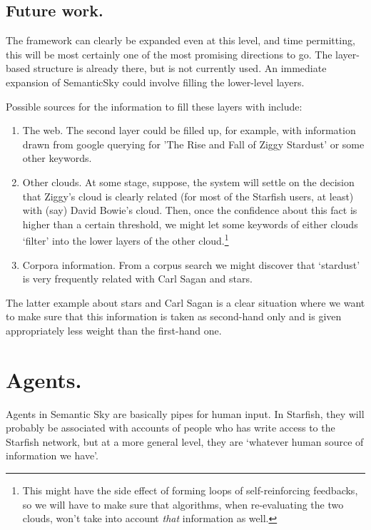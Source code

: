 \documentclass[11pt]{article}
\begin{document}
\subsection{Future work.}

The framework can clearly be expanded even at this level, and time permitting, this will be most certainly one of the most promising directions to go. The layer-based structure is already there, but is not currently used. An immediate expansion of SemanticSky could involve filling the lower-level layers.

Possible sources for the information to fill these layers with include:

\begin{enumerate}
\item The web. The second layer could be filled up, for example, with information drawn from google querying for 'The Rise and Fall of Ziggy Stardust' or some other keywords.
\item Other clouds. At some stage, suppose, the system will settle on the decision that Ziggy's cloud is clearly related (for most of the Starfish users, at least) with (say) David Bowie's cloud. Then, once the confidence about this fact is higher than a certain threshold, we might let some keywords of either clouds `filter' into the lower layers of the other cloud.\footnote{This might have the side effect of forming loops of self-reinforcing feedbacks, so we will have to make sure that algorithms, when re-evaluating the two clouds, won't take into account \emph{that} information as well.}
\item Corpora information. From a corpus search we might discover that `stardust' is very frequently related with Carl Sagan and stars.
\end{enumerate}

The latter example about stars and Carl Sagan is a clear situation where we want to make sure that this information is taken as second-hand only and is given appropriately less weight than the first-hand one.


\section{Agents.}

Agents in Semantic Sky are basically pipes for human input. In Starfish, they will probably be associated with accounts of people who has write access to the Starfish network, but at a more general level, they are `whatever human source of information we have'.
\end{document}

